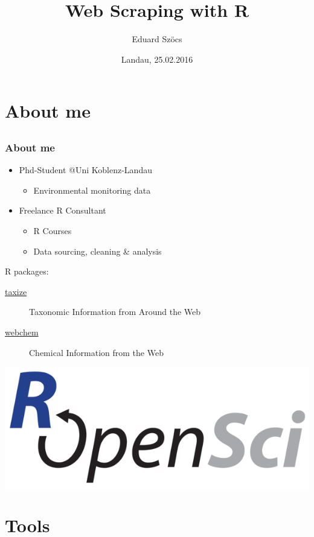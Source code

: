 \documentclass[12pt, t]{beamer}
\title{Web Scraping with R}
\author{Eduard Szöcs}
\institute{Institute for Environmental Sciences, University of Koblenz-Landau}
\date{Landau, 25.02.2016}
\begin{document}
\begin{frame}
\titlepage
\end{frame}


\section{About me} 
\subsection{}
\begin{frame}
\frametitle{About me}
\begin{itemize}
\item Phd-Student @Uni Koblenz-Landau
	\begin{itemize}
	\item Environmental monitoring data
	\end{itemize}
\item Freelance R Consultant
	\begin{itemize}
		\item R Courses
		\item Data sourcing, cleaning \& analysis
	\end{itemize}
\end{itemize}
\pause
\vspace{2em}
R packages:
\begin{description}
	\item[\href{https://github.com/ropensci/taxize}{taxize}]{Taxonomic Information from Around the Web}
	\item[\href{https://github.com/ropensci/webchem}{webchem}]{Chemical Information from the Web}
\end{description}
\begin{centering}
\colorbox{white}{\includegraphics[width =.3\textwidth]{fig/ropensci.png}}
\end{centering}
\end{frame}


\section{Tools}
\end{document}

